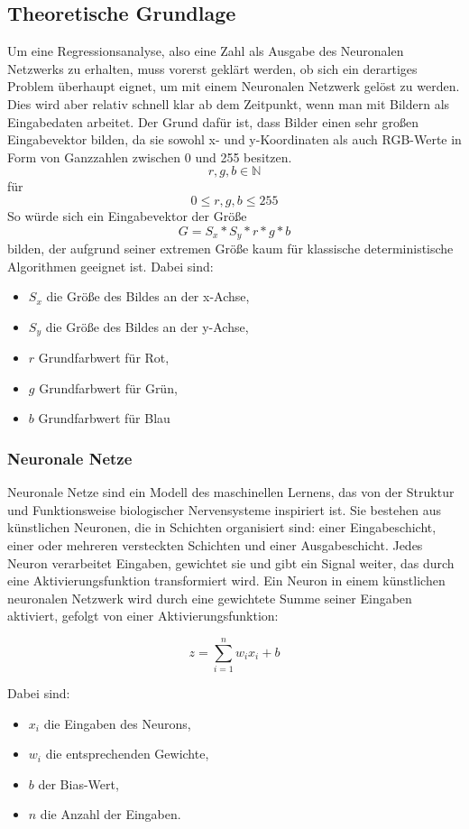 \subsection{Theoretische Grundlage}
Um eine Regressionsanalyse, also eine Zahl als Ausgabe des Neuronalen Netzwerks zu erhalten, muss vorerst geklärt werden, ob sich ein derartiges Problem überhaupt eignet, um mit einem Neuronalen Netzwerk gelöst zu werden. Dies wird aber relativ schnell klar ab dem Zeitpunkt, wenn man mit Bildern als Eingabedaten arbeitet. Der Grund dafür ist, dass Bilder einen sehr großen Eingabevektor bilden, da sie sowohl x- und y-Koordinaten als auch RGB-Werte in Form von Ganzzahlen zwischen 0 und 255 besitzen. 
\[r, g, b \in \mathbb{N}\] für \[0 \leq r, g, b \leq 255\]
So würde sich ein Eingabevektor der Größe
\[G = S_x * S_y * r * g * b\] bilden, der aufgrund seiner extremen Größe kaum für klassische deterministische Algorithmen geeignet ist. 
Dabei sind:
\begin{itemize}
    \item $S_x$ die Größe des Bildes an der x-Achse,
    \item $S_y$ die Größe des Bildes an der y-Achse,
    \item $r$ Grundfarbwert für Rot,
    \item $g$ Grundfarbwert für Grün,
    \item $b$ Grundfarbwert für Blau
\end{itemize}
\subsubsection{Neuronale Netze}

Neuronale Netze sind ein Modell des maschinellen Lernens, das von der Struktur und Funktionsweise biologischer Nervensysteme inspiriert ist. Sie bestehen aus künstlichen Neuronen, die in Schichten organisiert sind: einer Eingabeschicht, einer oder mehreren versteckten Schichten und einer Ausgabeschicht. Jedes Neuron verarbeitet Eingaben, gewichtet sie und gibt ein Signal weiter, das durch eine Aktivierungsfunktion transformiert wird. \cite{Jansson1991}
Ein Neuron in einem künstlichen neuronalen Netzwerk wird durch eine gewichtete Summe seiner Eingaben aktiviert, gefolgt von einer Aktivierungsfunktion:

\begin{equation}
    z = \sum_{i=1}^{n} w_i x_i + b
\end{equation}

Dabei sind:
\begin{itemize}
    \item $x_i$ die Eingaben des Neurons,
    \item $w_i$ die entsprechenden Gewichte,
    \item $b$ der Bias-Wert,
    \item $n$ die Anzahl der Eingaben.
\end{itemize}

